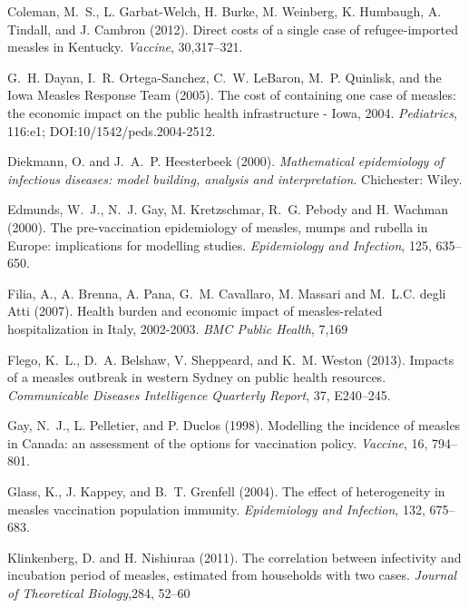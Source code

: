 \documentclass{article}
\begin{document}
\begin{thebibliography}{}
Coleman, M.~S., L. Garbat-Welch, H. Burke, M. Weinberg, K. Humbaugh, A. Tindall, and J. Cambron (2012).
\newblock Direct costs of a single case of refugee-imported measles in Kentucky.
\newblock \emph{Vaccine}, 30,317--321.

G.~H. Dayan, I.~R. Ortega-Sanchez, C.~W. LeBaron, M.~P. Quinlisk, and the Iowa Measles Response Team (2005).
\newblock The cost of containing one case of measles: the economic impact on the public health infrastructure - Iowa, 2004.
\newblock \emph{Pediatrics}, 116:e1; DOI:10/1542/peds.2004-2512.

Diekmann, O. and  J.~A.~P. Heesterbeek (2000).
\newblock \emph{Mathematical epidemiology of infectious diseases: model building, analysis and interpretation}.
Chichester: Wiley.

Edmunds, W.~J., N.~J. Gay, M. Kretzschmar, R.~G. Pebody and H. Wachman (2000).
\newblock The pre-vaccination epidemiology of measles, mumps and rubella in Europe: implications for modelling studies.
\newblock \emph{Epidemiology and Infection}, 125, 635--650.

Filia, A., A. Brenna, A. Pana, G.~M. Cavallaro, M. Massari and M.~L.C. degli Atti (2007).
\newblock Health burden and economic impact of measles-related hospitalization in Italy, 2002-2003.
\newblock \emph{BMC Public Health}, 7,169

Flego, K.~L., D.~A. Belshaw, V. Sheppeard, and K.~M. Weston (2013).
\newblock Impacts of a measles outbreak in western Sydney on public health resources.
\newblock \emph{Communicable Diseases Intelligence Quarterly Report}, 37, E240--245.

Gay, N.~J., L. Pelletier, and P. Duclos (1998).
\newblock Modelling the incidence of measles in Canada: an assessment of the options for vaccination policy.
\newblock \emph{Vaccine}, 16, 794--801.

Glass, K., J. Kappey, and B.~T. Grenfell (2004).
\newblock The effect of heterogeneity in measles vaccination population immunity.
\newblock \emph{Epidemiology and Infection}, 132, 675--683.

Klinkenberg, D. and H. Nishiuraa (2011).
\newblock The correlation between infectivity and incubation period of measles, estimated from households with two cases.
\newblock \emph{Journal of Theoretical Biology},284, 52--60


\end{thebibliography}
\end{document}
